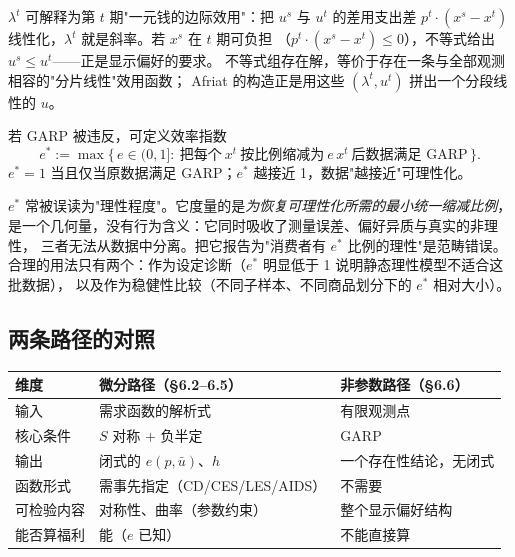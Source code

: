 \begin{remark}
$\lambda^t$ 可解释为第 $t$ 期"一元钱的边际效用"：把 $u^s$ 与 $u^t$ 的差用支出差
$p^t\cdot(x^s-x^t)$ 线性化，$\lambda^t$ 就是斜率。若 $x^s$ 在 $t$ 期可负担
（$p^t\cdot(x^s-x^t)\le0$），不等式给出 $u^s\le u^t$——正是显示偏好的要求。
不等式组存在解，等价于存在一条与全部观测相容的"分片线性"效用函数；
Afriat 的构造正是用这些 $(\lambda^t,u^t)$ 拼出一个分段线性的 $u$。
\end{remark}

\begin{definition}
若 GARP 被违反，可定义效率指数
\[
 e^*:=\max\bigl\{\,e\in(0,1]:\ \text{把每个}\ x^t\ \text{按比例缩减为}\ e\,x^t\ \text{后数据满足 GARP}\,\bigr\}.
\]
$e^*=1$ 当且仅当原数据满足 GARP；$e^*$ 越接近 1，数据"越接近"可理性化。
\end{definition}

\begin{remark}[指数不能当拟合优度用]
$e^*$ 常被误读为"理性程度"。它度量的是\emph{为恢复可理性化所需的最小统一缩减比例}，
是一个几何量，没有行为含义：它同时吸收了测量误差、偏好异质与真实的非理性，
三者无法从数据中分离。把它报告为"消费者有 $e^*$ 比例的理性"是范畴错误。
合理的用法只有两个：作为设定诊断（$e^*$ 明显低于 1 说明静态理性模型不适合这批数据），
以及作为稳健性比较（不同子样本、不同商品划分下的 $e^*$ 相对大小）。
\end{remark}

\subsection{两条路径的对照}

\begin{center}
\begin{tabular}{lll}
\toprule
维度 & 微分路径（\S 6.2--6.5） & 非参数路径（\S 6.6）\\
\midrule
输入 & 需求函数的解析式 & 有限观测点\\
核心条件 & $S$ 对称 $+$ 负半定 & GARP\\
输出 & 闭式的 $e(p,\bar u)$、$h$ & 一个存在性结论，无闭式\\
函数形式 & 需事先指定（CD/CES/LES/AIDS） & 不需要\\
可检验内容 & 对称性、曲率（参数约束） & 整个显示偏好结构\\
能否算福利 & 能（$e$ 已知） & 不能直接算\\
\bottomrule
\end{tabular}
\end{center}

